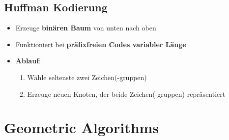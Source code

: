 \documentclass[10pt,a4paper]{article}
\begin{document}
	\subsection{Huffman Kodierung}
	\label{bwt:sub:huffman_kodierung}

	\begin{itemize}
		\item Erzeuge \textbf{binären Baum} von unten nach oben
		\item Funktioniert bei \textbf{präfixfreien Codes variabler Länge}
		\item \textbf{Ablauf}:
		\begin{enumerate}
			\item Wähle seltenste zwei Zeichen(-gruppen)
			\item Erzeuge neuen Knoten, der beide Zeichen(-gruppen) repräsentiert
		\end{enumerate}
	\end{itemize}

	\newpage
	\section{Geometric Algorithms}
	\label{ga:sec:geometric_algorithms}
	
\end{document}
